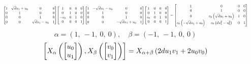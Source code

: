 \documentclass[11pt]{article}
\theoremstyle{definition}
\begin{document}
\[
\scaletoalign{\textwidth}{{\left[\begin{matrix}1 & \sqrt{d} u_{1} + u_{0} & 0 & 0\\0 & 1 & 0 & 0\\0 & 0 & 1 & 0\\0 & 0 & \sqrt{d} u_{1} - u_{0} & 1\end{matrix}\right]} {\left[\begin{matrix}1 & 0 & 0 & 0\\0 & 1 & 0 & 0\\- v_{0} & 0 & 1 & 0\\0 & 0 & 0 & 1\end{matrix}\right]} {\left[\begin{matrix}1 & - \sqrt{d} u_{1} - u_{0} & 0 & 0\\0 & 1 & 0 & 0\\0 & 0 & 1 & 0\\0 & 0 & - \sqrt{d} u_{1} + u_{0} & 1\end{matrix}\right]} {\left[\begin{matrix}1 & 0 & 0 & 0\\0 & 1 & 0 & 0\\v_{0} & 0 & 1 & 0\\0 & 0 & 0 & 1\end{matrix}\right]} = {\left[\begin{matrix}1 & 0 & 0 & 0\\0 & 1 & 0 & 0\\0 & v_{0} \left(\sqrt{d} u_{1} + u_{0}\right) & 1 & 0\\v_{0} \left(- \sqrt{d} u_{1} + u_{0}\right) & v_{0} \left(d u_{1}^{2} - u_{0}^{2}\right) & 0 & 1\end{matrix}\right]}}
\]
\[
\alpha = \left( 1, \  -1, \  0, \  0\right), \quad \beta = \left( -1, \  -1, \  0, \  0\right)
\]
\[
\scaletoalign{\textwidth}{\left[ X_{\alpha}\left(\left[\begin{matrix}u_{0}\\u_{1}\end{matrix}\right]\right), X_{\beta}\left(\left[\begin{matrix}v_{0}\\v_{1}\end{matrix}\right]\right) \right] = X_{\alpha + \beta}\left(2 d u_{1} v_{1} + 2 u_{0} v_{0}\right)}
\]
\end{document}
